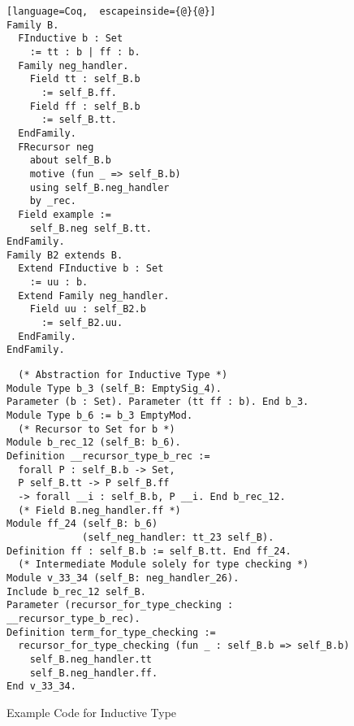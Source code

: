 \begin{figure}[!htb]
  \begin{minipage}[t]{0.32\linewidth}
\begin{lstlisting}[language=Coq,  escapeinside={@}{@}]
Family B.
  FInductive b : Set 
    := tt : b | ff : b.
  Family neg_handler. 
    Field tt : self_B.b 
      := self_B.ff.
    Field ff : self_B.b 
      := self_B.tt.
  EndFamily.
  FRecursor neg 
    about self_B.b 
    motive (fun _ => self_B.b)
    using self_B.neg_handler
    by _rec.
  Field example := 
    self_B.neg self_B.tt. 
EndFamily.
Family B2 extends B.
  Extend FInductive b : Set 
    := uu : b.
  Extend Family neg_handler.
    Field uu : self_B2.b 
      := self_B2.uu.
  EndFamily. 
EndFamily.
\end{lstlisting}
  \end{minipage}
  \begin{minipage}[t]{0.65\linewidth}
\begin{verbatim}
  (* Abstraction for Inductive Type *)
Module Type b_3 (self_B: EmptySig_4).
Parameter (b : Set). Parameter (tt ff : b). End b_3.      
Module Type b_6 := b_3 EmptyMod.
  (* Recursor to Set for b *)
Module b_rec_12 (self_B: b_6).
Definition __recursor_type_b_rec :=
  forall P : self_B.b -> Set,
  P self_B.tt -> P self_B.ff 
  -> forall __i : self_B.b, P __i. End b_rec_12. 
  (* Field B.neg_handler.ff *)
Module ff_24 (self_B: b_6) 
             (self_neg_handler: tt_23 self_B).
Definition ff : self_B.b := self_B.tt. End ff_24.
  (* Intermediate Module solely for type checking *)
Module v_33_34 (self_B: neg_handler_26).
Include b_rec_12 self_B.
Parameter (recursor_for_type_checking : __recursor_type_b_rec).
Definition term_for_type_checking :=
  recursor_for_type_checking (fun _ : self_B.b => self_B.b)
    self_B.neg_handler.tt
    self_B.neg_handler.ff.  
End v_33_34.
\end{verbatim}
  \end{minipage}
\caption{Example Code for Inductive Type}\label{fig:plugin-example2}
\end{figure}






